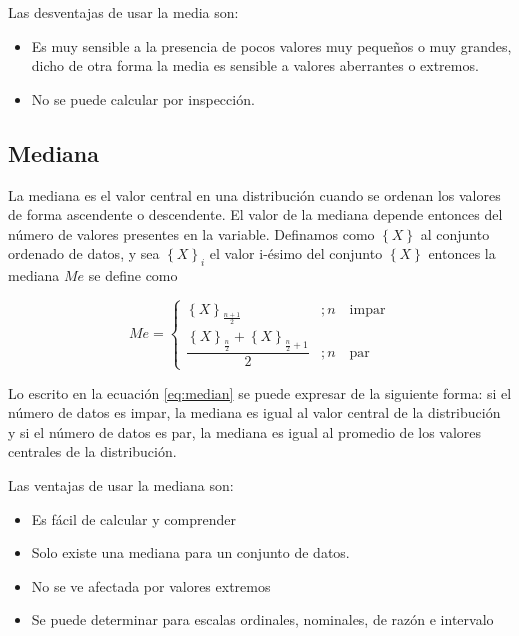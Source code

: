 \documentclass[letterpaper,]{book}
\providecommand{\tightlist}{%
  \setlength{\itemsep}{0pt}\setlength{\parskip}{0pt}}
\begin{document}
Las desventajas de usar la media son:

\begin{itemize}
\tightlist
\item
  Es muy sensible a la presencia de pocos valores muy pequeños o muy grandes, dicho de otra forma la media es sensible a valores aberrantes o extremos.
\item
  No se puede calcular por inspección.
\end{itemize}

\hypertarget{mediana}{%
\subsection{Mediana}\label{mediana}}

La mediana es el valor central en una distribución cuando se ordenan los valores de forma ascendente o descendente. El valor de la mediana depende entonces del número de valores presentes en la variable. Definamos como \(\left\{ X \right \}\) al conjunto ordenado de datos, y sea \(\left \{ X \right \}_i\) el valor i-ésimo del conjunto \(\left \{ X \right \}\) entonces la mediana \(Me\) se define como

\begin{equation}
Me = \begin{cases} 
      \left \{ X \right\}_{\frac{n+1}{2}} & ; n \quad \textrm{impar}  \\
      \dfrac{\left \{ X  \right \}_{\frac{n}{2}} + \left \{ X  \right \}_{\frac{n}{2}+1} }{2} & ; n \quad \textrm{par}
   \end{cases}
   \label{eq:median}
\end{equation}

Lo escrito en la ecuación \eqref{eq:median} se puede expresar de la siguiente forma: si el número de datos es impar, la mediana es igual al valor central de la distribución y si el número de datos es par, la mediana es igual al promedio de los valores centrales de la distribución.

Las ventajas de usar la mediana son:

\begin{itemize}
\tightlist
\item
  Es fácil de calcular y comprender
\item
  Solo existe una mediana para un conjunto de datos.
\item
  No se ve afectada por valores extremos
\item
  Se puede determinar para escalas ordinales, nominales, de razón e intervalo
\end{itemize}
\end{document}
